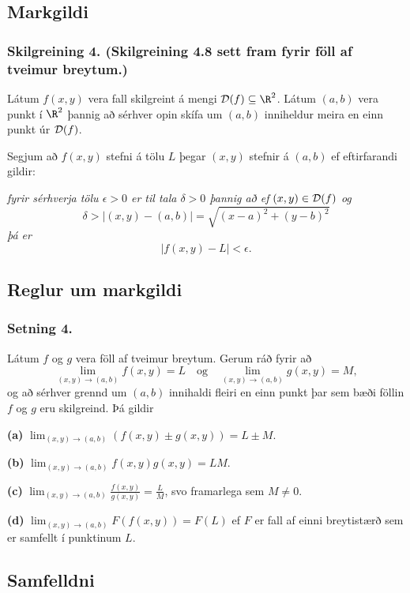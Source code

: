 \subsection{Markgildi}
 \subsubsection{Skilgreining 4. (Skilgreining 4.8 sett fram fyrir föll af tveimur breytum.)  }
 
  
Látum $f(x,y)$ vera fall skilgreint á mengi  ${\cal D}(f)\subseteq \R^2$.  Látum $(a,b)$ vera punkt í $\R^2$ þannig að sérhver opin skífa um $(a,b)$ inniheldur meira en einn punkt úr ${\cal D}(f)$.

Segjum að $f(x,y)$  stefni á tölu $L$ þegar $(x,y)$  stefnir á $(a,b)$ ef eftirfarandi gildir:

\smallskip
\noindent
{\em fyrir sérhverja tölu $\epsilon>0$ er til tala $\delta>0$
þannig að ef $(x,y)\in{\cal D}(f)$ og
$$\delta>|(x,y)-(a,b)|=\sqrt{(x-a)^2+(y-b)^2}$$ 
þá er  
$$|f(x,y)-L|<\epsilon.$$}

 




\subsection{Reglur um markgildi}
 \subsubsection{Setning 4.}
  Látum $f$ og $g$ vera föll af tveimur breytum.  Gerum ráð  fyrir að 
$$\lim_{(x,y)\rightarrow (a,b)}f(x,y)=L\quad\mbox{og}\quad
\lim_{(x,y)\rightarrow (a,b)}g(x,y)=M,$$
og að sérhver grennd um $(a,b)$ innihaldi fleiri en einn punkt þar sem bæði föllin $f$ og $g$ eru skilgreind. Þá gildir

{\bf (a)}  $\lim_{(x,y)\rightarrow (a,b)}(f(x,y)\pm g(x,y))=L\pm M$.

{\bf (b)}  $\lim_{(x,y)\rightarrow (a,b)}f(x,y) g(x,y)=LM$.

{\bf (c)}  $\lim_{(x,y)\rightarrow (a,b)}\frac{f(x,y)}{g(x,y)}=
\frac{L}{M}$, svo framarlega sem $M\neq 0$.

{\bf (d)}  $\lim_{(x,y)\rightarrow (a,b)}F(f(x,y))=F(L)$ ef $F$ er fall af einni breytistærð sem er samfellt í punktinum $L$.
 
 




\subsection{Samfelldni}
